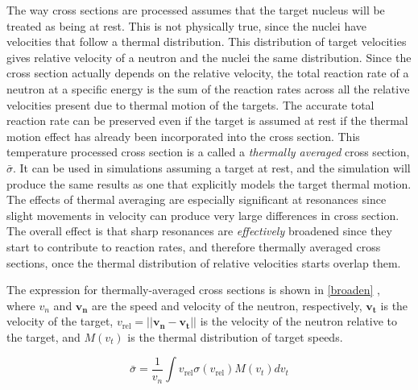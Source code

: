 The way cross sections are processed assumes that the target nucleus will be treated as being at rest.  This is not physically true, since the nuclei have velocities that follow a thermal distribution.  This distribution of target velocities gives relative velocity of a neutron and the nuclei the same distribution.  Since the cross section actually depends on the relative velocity, the total reaction rate of a neutron at a specific energy is the sum of the reaction rates across all the relative velocities present due to thermal motion of the targets.  The accurate total reaction rate can be preserved even if the target is assumed at rest if the thermal motion effect has already been incorporated into the cross section.  This temperature processed cross section is a called a \emph{thermally averaged} cross section, $\bar{\sigma}$. It can be used in simulations assuming a target at rest, and the simulation will produce the same results as one that explicitly models the target thermal motion.  The effects of thermal averaging are especially significant at resonances since slight movements in velocity can produce very large differences in cross section.  The overall effect is that sharp resonances are \emph{effectively} broadened since they start to contribute to reaction rates, and therefore thermally averaged cross sections, once the thermal distribution of relative velocities starts overlap them.  
 
The expression for thermally-averaged cross sections is shown in \eqref{broaden} \cite{openmc}, where $v_n$ and $\boldsymbol{v_n}$ are the speed and velocity of the neutron, respectively, $\boldsymbol{v_t}$ is the velocity of the target, $v_\mathrm{rel} = || \boldsymbol{v_n} -\boldsymbol{v_t}||$ is the velocity of the neutron relative to the target, and $M(v_t)$ is the thermal distribution of target speeds.  

\begin{equation}
\bar{\sigma} = \frac{1}{v_n} \int v_\mathrm{rel} \sigma(v_\mathrm{rel}) M(v_t) dv_t
\label{broaden}
\end{equation}

